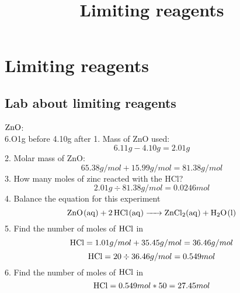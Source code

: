 \documentclass[
]{article}
\title{Limiting reagents}
\author{}
\date{}
\begin{document}
\maketitle

\hypertarget{limiting-reagents}{%
\section{Limiting reagents}\label{limiting-reagents}}

\hypertarget{lab-about-limiting-reagents}{%
\subsection{Lab about limiting
reagents}\label{lab-about-limiting-reagents}}

\(\ce{ZnO}\):\\
6.O1g before 4.10g after 1. Mass of ZnO used:
\[6.11 g - 4.10 g = 2.01 g\] 2. Molar mass of ZnO:
\[65.38 g/mol + 15.99 g/mol = 81.38 g/mol\] 3. How many moles of zinc
reacted with the HCl? \[2.01 g \div 81.38 g/mol = 0.0246 mol\] 4.
Balance the equation for this experiment
\[\ce{ZnO(aq) + 2 HCl(aq) -> ZnCl2(aq) + H2O(l)}\] 5. Find the number of
moles of \(\ce{HCl}\) in
\[\ce{HCl} = 1.01g/mol + 35.45g/mol = 36.46g/mol\]
\[\ce{HCl} = 20 \div 36.46g/mol = 0.549 mol\] 6. Find the number of
moles of \(\ce{HCl}\) in \[\ce{HCl} = 0.549 mol * 50 = 27.45 mol\]
\end{document}
